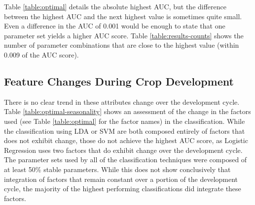 \documentclass[letterpaper]{report}
\begin{document}
{
\renewcommand{\arraystretch}{0.9}

}

Table \ref{table:optimal} details the absolute highest AUC, but the difference between the highest AUC and the next highest value is sometimes quite small. Even a difference in the AUC of 0.001 would be enough to state that one parameter set yields a higher AUC score. Table \ref{table:results-counts} shows the number of parameter combinations that are close to the highest value (within 0.009 of the AUC score).

{


}



\subsection{Feature Changes During Crop Development}
There is no clear trend in these attributes change over the development cycle. Table \ref{table:optimal-seasonality} shows an assessment of the change in the factors used (see Table \ref{table:optimal} for the factor names) in the classification. While the classification using LDA or SVM  are both composed entirely of factors that does not exhibit change, those do not achieve the highest AUC score, as Logistic Regression uses two factors that do exhibit change over the development cycle. The parameter sets used by all of the classification techniques were composed of at least 50\%  stable parameters. While this does not show conclusively that integration of factors that remain constant over a portion of the development cycle, the majority of the highest performing classifications did integrate these factors.
{


}
%
%
%
\end{document}
